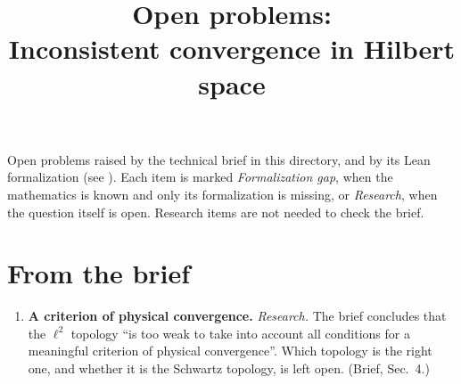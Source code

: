 \documentclass[11pt]{article}
\title{Open problems:\\ Inconsistent convergence in Hilbert space}
\author{}
\date{}
\begin{document}
\maketitle

\noindent
Open problems raised by the technical brief in this directory, and by its Lean formalization
(see ). Each item is marked \emph{Formalization gap}, when the mathematics is known and only its
formalization is missing, or \emph{Research}, when the question itself is open.
Research items are not needed to check the brief.

\section*{From the brief}
\begin{enumerate}
\item \textbf{A criterion of physical convergence.} \emph{Research.} The brief concludes that the $\ell^2$ topology
  ``is too weak to take into account all conditions for a meaningful criterion of physical
  convergence''. Which topology is the right one, and whether it is the Schwartz topology, is
  left open. (Brief, Sec.~4.)
\end{enumerate}
\end{document}
